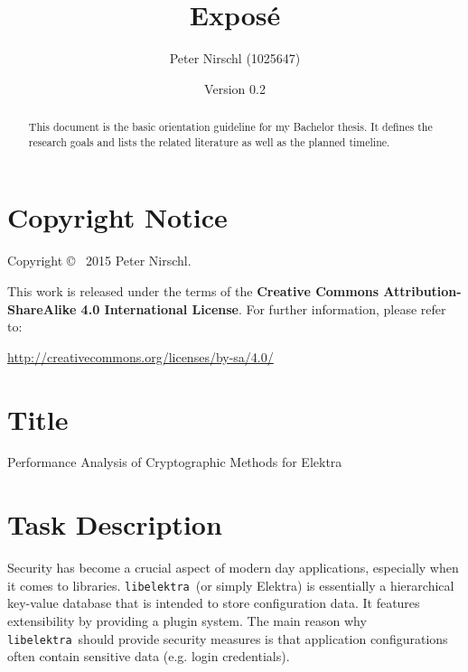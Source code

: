 \documentclass[a4paper,12pt]{article}
\title{Exposé}
\author{Peter Nirschl (1025647)}
\date{Version 0.2}
\newcommand{\libelektra}{\texttt{libelektra}~}
\begin{document}
\maketitle
\begin{abstract}
This document is the basic orientation guideline for my Bachelor thesis.
It defines the research goals and lists the related literature as well as the planned timeline.
\end{abstract}

\vfill

\section*{Copyright Notice}

Copyright \copyright~ 2015 Peter Nirschl.

This work is released under the terms of the \textbf{Creative Commons Attribution-ShareAlike 4.0 International License}.
For further information, please refer to:

\url{http://creativecommons.org/licenses/by-sa/4.0/}

\newpage

\section{Title}

Performance Analysis of Cryptographic Methods for Elektra


\section{Task Description}

Security has become a crucial aspect of modern day applications, especially when it comes to libraries.
\libelektra (or simply Elektra) is essentially a hierarchical key-value database that is intended to store configuration data. It features extensibility by providing a plugin system. The main reason why \libelektra should provide security measures is that application configurations often contain sensitive data (e.g. login credentials).
\end{document}
